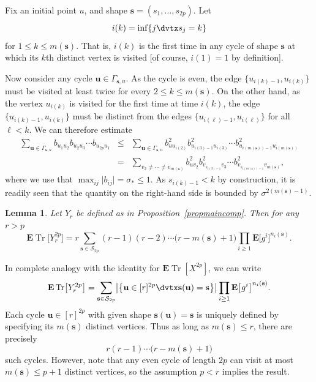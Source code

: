 \documentclass[aop,MSNbibl,dvips]{arximspdf}
\newcommand{\rrvert}{\vert}
\newcommand{\llvert}{\vert}
\newtheorem{lem}[teo]{Lemma}
\newcommand{\EE}{\mathbf{E}}
\newcommand{\Tr}{\operatorname{Tr}}
\begin{document}
\begin{pf}
Fix an initial point $u$, and shape $\mathbf{s}=(s_1,\ldots,s_{2p})$. Let
%
\[
i(k) = \inf\{j\dvtx s_j=k\} %
\]
%
for $1\le k\le m(\mathbf{s})$. That is, $i(k)$ is the first time in any
cycle of shape $\mathbf{s}$ at which its $k$th distinct vertex is visited
[of course, $i(1)=1$ by definition].

Now consider any cycle $\mathbf{u}\in\Gamma_{\mathbf{s},u}$.
As the cycle is even, the edge $\{u_{i(k)-1},u_{i(k)}\}$ must be visited
at least twice for every $2\le k\le m(\mathbf{s})$. On the other hand, as
the vertex $u_{i(k)}$ is visited for the first time at time $i(k)$, the
edge $\{u_{i(k)-1},u_{i(k)}\}$ must be distinct from the edges
$\{u_{i(\ell)-1},u_{i(\ell)}\}$ for all $\ell<k$. We can therefore
estimate
%
\begin{eqnarray*}
\sum_{\mathbf{u}\in\Gamma_{\mathbf{s},u}} b_{u_1u_2}b_{u_2u_3}\cdots
b_{u_{2p}u_1} &\le&\sum_{\mathbf{u}\in\Gamma_{\mathbf{s},u}} b_{uu_{i(2)}}^2
b_{u_{i(3)-1}u_{i(3)}}^2 \cdots b_{u_{i(m(\mathbf{s}))-1}u_{i(m(\mathbf{s}))}}^2
\\
&=& \sum_{v_2\ne\cdots\ne v_{m(\mathbf{s})}} b_{uv_2}^2
b_{v_{s_{i(3)-1}}v_3}^2 \cdots b_{v_{s_{i(m(\mathbf{s}))-1}}v_{m(\mathbf
{s})}}^2,
\end{eqnarray*}
%
where we use that $\max_{ij}\llvert b_{ij}\rrvert =\sigma_*\le1$.
As $s_{i(k)-1}<k$ by construction, it is readily seen that the quantity on
the right-hand side is bounded by $\sigma^{2(m(\mathbf{s})-1)}$.
\end{pf}

%
\begin{lem}
\label{lemcomp2}
Let $Y_r$ be defined as in Proposition~\ref{propmaincomp}.
Then for any $r>p$
%
\[
\EE\Tr\bigl[Y_r^{2p}\bigr] = r\sum
_{\mathbf{s}\in\mathcal{S}_{2p}} (r-1) (r-2)\cdots\bigl(r-m(\mathbf
{s})+1\bigr) \prod
_{i\ge1}\EE\bigl[g^{i}\bigr]^{n_i(\mathbf{s})}.
%
\]
%
\end{lem}

\begin{pf}
In complete analogy with the identity for $\EE\Tr[X^{2p}]$, we can write
%
\[
\EE\Tr\bigl[Y_r^{2p}\bigr] = \sum
_{\mathbf{s}\in\mathcal{S}_{2p}} \bigl\llvert\bigl\{\mathbf{u}\in
[r]^{2p}\dvtx
\mathbf{s}(\mathbf{u})=\mathbf{s}\bigr\}\bigr\rrvert\prod
_{i\ge1}\EE\bigl[g^{i}\bigr]^{n_i(\mathbf{s})}.
%
\]
%
Each cycle $\mathbf{u}\in[r]^{2p}$ with given shape
$\mathbf{s}(\mathbf{u})=\mathbf{s}$ is uniquely defined by
specifying its
$m(\mathbf{s})$ distinct vertices. Thus as long as $m(\mathbf{s})\le r$,
there are precisely
%
\[
r(r-1)\cdots\bigl(r-m(\mathbf{s})+1\bigr) %
\]
%
such cycles.
However, note that any even cycle of length $2p$ can visit at most
$m(\mathbf{s})\le p+1$ distinct vertices, so the assumption $p<r$ implies
the result.
\end{pf}
\end{document}
